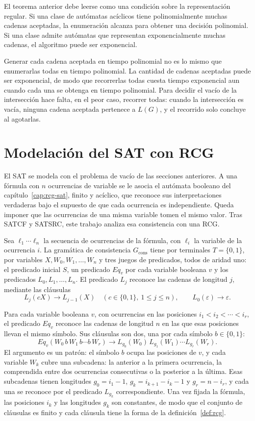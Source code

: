 \documentclass{report}
\theoremstyle{definition}
\theoremstyle{plain}
\theoremstyle{remark}
\begin{document}
El teorema anterior debe leerse como una condición sobre la
representación regular. Si una clase de autómatas acíclicos tiene
polinomialmente muchas cadenas aceptadas, la
enumeración alcanza para obtener una decisión polinomial. Si una clase
admite autómatas que representan exponencialmente muchas cadenas, el
algoritmo puede ser exponencial.

Generar cada cadena aceptada en tiempo polinomial no es lo mismo que
enumerarlas todas en tiempo polinomial. La cantidad de cadenas
aceptadas puede ser exponencial, de modo que recorrerlas todas cuesta
tiempo exponencial aun cuando cada una se obtenga en tiempo polinomial.
Para decidir el vacío de la intersección hace falta, en el peor caso,
recorrer todas: cuando la intersección es vacía, ninguna cadena aceptada
pertenece a $L(G)$, y el recorrido solo concluye al agotarlas.

\section{Modelación del SAT con RCG}
\label{sec:modelacion-sat}

El SAT se modela con el problema de vacío de las secciones anteriores. A
una fórmula con $n$ ocurrencias de variable se le asocia el autómata
booleano del capítulo~\ref{cap:rcg-sat}, finito y acíclico, que reconoce
sus interpretaciones verdaderas bajo el supuesto de que cada ocurrencia
es independiente. Queda imponer que las ocurrencias de una misma
variable tomen el mismo valor. Tras SATCF y SATSRC, este
trabajo analiza esa consistencia con una RCG.

Sea $\ell_1\cdots\ell_n$ la secuencia de ocurrencias de la fórmula, con
$\ell_i$ la variable de la ocurrencia $i$. La gramática de consistencia
$G_{\mathrm{cons}}$ tiene por terminales $T=\{0,1\}$, por variables
$X, W_0, W_1, \ldots, W_n$ y tres juegos de predicados, todos de
aridad uno: el predicado inicial $S$, un predicado $Eq_v$ por cada
variable booleana $v$ y los predicados $L_0, L_1, \ldots, L_n$. El
predicado $L_j$ reconoce las cadenas de longitud $j$, mediante las
cláusulas
\[
  L_j(cX) \to L_{j-1}(X) \quad (c \in \{0,1\},\ 1 \le j \le n),
  \qquad L_0(\varepsilon) \to \varepsilon.
\]

Para cada variable booleana $v$, con ocurrencias en las posiciones
$i_1 < i_2 < \cdots < i_r$, el predicado $Eq_v$ reconoce las cadenas de
longitud $n$ en las que esas posiciones llevan el mismo símbolo. Sus
cláusulas son dos, una por cada símbolo $b \in \{0,1\}$:
\[
  Eq_v(W_0\, b\, W_1\, b \cdots b\, W_r) \to
  L_{g_0}(W_0)\, L_{g_1}(W_1) \cdots L_{g_r}(W_r).
\]
El argumento es un patrón: el símbolo $b$ ocupa las posiciones de $v$, y
cada variable $W_k$ cubre una subcadena: la anterior a la primera
ocurrencia, la comprendida entre dos ocurrencias consecutivas o la
posterior a la última. Esas subcadenas tienen longitudes
$g_0 = i_1 - 1$, $g_k = i_{k+1} - i_k - 1$ y $g_r = n - i_r$, y cada
una se reconoce por el predicado $L_{g_k}$ correspondiente. Una vez
fijada la fórmula, las posiciones $i_k$ y las longitudes $g_k$ son
constantes, de modo que el conjunto de cláusulas es finito y cada
cláusula tiene la forma de la definición~\ref{def:rcg}.
\end{document}
